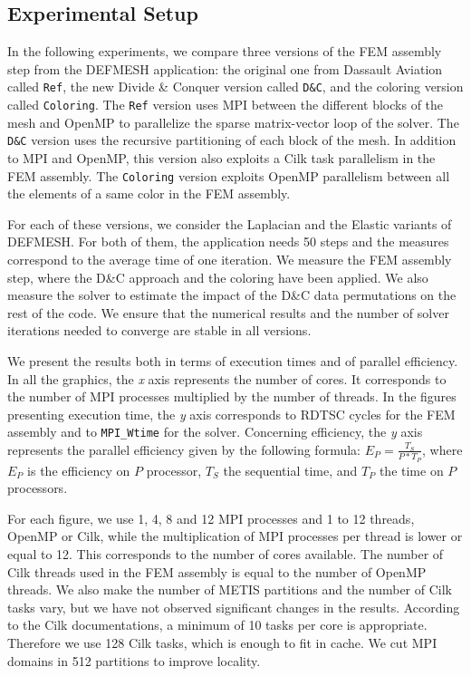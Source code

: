 \documentclass[10pt]{IOS-Book-Article}
\begin{document}
\subsection{Experimental Setup}
In the following experiments, we compare three versions of the FEM assembly step from the DEFMESH application:
the original one from Dassault Aviation called {\tt Ref}, the new Divide \& Conquer version called {\tt D\&C}, and the coloring version called {\tt Coloring}.
The {\tt Ref} version uses MPI between the different blocks of the mesh and OpenMP to parallelize the sparse matrix-vector loop of the solver.
The {\tt D\&C} version uses the recursive partitioning of each block of the mesh.
In addition to MPI and OpenMP, this version also exploits a Cilk task parallelism in the FEM assembly.
The {\tt Coloring} version exploits OpenMP parallelism between all the elements of a same color in the FEM assembly.

For each of these versions, we consider the Laplacian and the Elastic variants of DEFMESH.
For both of them, the application needs 50 steps and the measures correspond to the average time of one iteration.
We measure the FEM assembly step, where the D\&C approach and the coloring have been applied.
We also measure the solver to estimate the impact of the D\&C data permutations on the rest of the code.
We ensure that the numerical results and the number of solver iterations needed to converge are stable in all versions.

We present the results both in terms of execution times and of parallel efficiency.
In all the graphics, the \emph{x} axis represents the number of cores. It corresponds to the number of MPI processes multiplied by the number of threads.
In the figures presenting execution time, the \emph{y} axis corresponds to RDTSC cycles for the FEM assembly and to \texttt{MPI\_Wtime} for the solver.
Concerning efficiency, the \emph{y} axis represents the parallel efficiency given by the following formula:
$E_{P} = \frac{T_{S}}{P*T_{P}}$, where $E_{P}$ is the efficiency on $P$ processor, $T_{S}$ the sequential time, and $T_{P}$ the time on $P$ processors.

For each figure, we use 1, 4, 8 and 12 MPI processes and 1 to 12 threads, OpenMP or Cilk, while the multiplication of MPI processes per thread is lower or equal to 12.
This corresponds to the number of cores available. The number of Cilk threads used in the FEM assembly is equal to the number of OpenMP threads.
We also make the number of METIS partitions and the number of Cilk tasks vary, but we have not observed significant changes in the results.
According to the Cilk documentations, a minimum of 10 tasks per core is appropriate. Therefore we use 128 Cilk tasks, which is enough to fit in cache.
We cut MPI domains in 512 partitions to improve locality.
\end{document}
